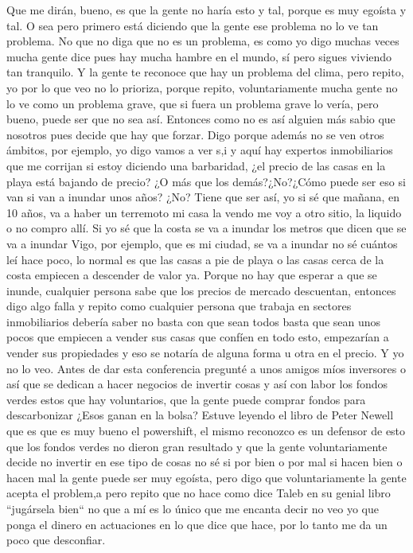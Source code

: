 Que me dirán, bueno, es que la gente no haría esto y tal, porque es muy egoísta y tal. O sea pero primero está diciendo que la gente ese problema no lo ve tan problema. No que no diga que no es un problema, es como yo digo muchas veces mucha gente dice pues hay mucha hambre en el mundo, sí pero sigues viviendo tan tranquilo. Y la gente te reconoce que hay un problema del clima, pero repito, yo por lo que veo no lo prioriza, porque repito, voluntariamente mucha gente no lo ve como un problema grave, que si fuera un problema grave lo vería, pero bueno, puede ser que no sea así. Entonces como no es así alguien más sabio que nosotros pues decide que hay que forzar. Digo porque además no se ven otros ámbitos, por ejemplo, yo digo vamos a ver s,i y aquí hay expertos inmobiliarios que me corrijan si estoy diciendo una barbaridad, ¿el precio de las casas en la playa está bajando de precio? ¿O más que los demás?¿No?¿Cómo puede ser eso si van si van a inundar unos años? ¿No? Tiene que ser así, yo si sé que mañana, en 10 años, va a haber un terremoto mi casa la vendo me voy a otro sitio, la liquido o no compro allí. Si yo sé que la costa se va a inundar los metros que dicen que se va a inundar Vigo, por ejemplo, que es mi ciudad, se va a inundar no sé cuántos leí hace poco, lo normal es que las casas a pie de playa o las casas cerca de la costa empiecen a descender de valor ya. Porque no hay que esperar a que se inunde, cualquier persona sabe que los precios de mercado descuentan, entonces digo algo falla y repito como cualquier persona que trabaja en sectores inmobiliarios debería saber no basta con que sean todos basta que sean unos pocos que empiecen a vender sus casas que confíen en todo esto, empezarían a vender sus propiedades y eso se notaría de alguna forma u otra en el precio. Y yo no lo veo. Antes de dar esta conferencia pregunté a unos amigos míos inversores o así que se dedican a hacer negocios de invertir cosas y así con labor los fondos verdes estos que hay voluntarios, que la gente puede comprar fondos para descarbonizar ¿Esos ganan en la bolsa? Estuve leyendo el libro de Peter Newell que es que es muy bueno el powershift, el mismo reconozco es un defensor de esto que los fondos verdes no dieron gran resultado y que la gente voluntariamente decide no invertir en ese tipo de cosas no sé si por bien o por mal si hacen bien o hacen mal la gente puede ser muy egoísta, pero digo que voluntariamente la gente acepta el problem,a pero repito que no hace como dice Taleb en su genial libro ``jugársela bien`` no que a mí es lo único que me encanta decir no veo yo que ponga el dinero en actuaciones en lo que dice que hace, por lo tanto me da un poco que desconfiar. 

